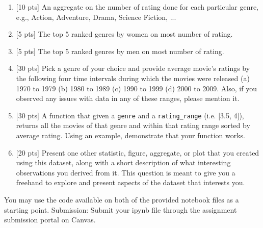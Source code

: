 \documentclass[letter-paper,12pt]{article} %
\begin{document}
\begin{enumerate}
    \item {[10 pts]} An aggregate on the number of rating done for each particular genre, e.g., Action, Adventure, Drama, Science Fiction, ...
    \item {[5 pts]} The top 5 ranked genres by women on most number of rating.
    \item {[5 pts]} The top 5 ranked genres by men on most number of rating.
    \item {[30 pts]} Pick a genre of your choice and provide average movie's ratings by the following four time intervals during which the movies were released (a) 1970 to 1979 (b) 1980 to 1989 (c) 1990 to 1999 (d) 2000 to 2009. Also, if you observed any issues with data in any of these ranges, please mention it.    
    \item {[30 pts]} A function that given a \verb|genre| and a \verb|rating_range| (i.e. [3.5, 4]), returns all the movies of that genre and within that rating range sorted by average rating. Using an example, demonstrate that your function works.  
    \item {[20 pts]} Present one other statistic, figure, aggregate, or plot that you created using this dataset, along with a short description of what interesting observations you derived from it. This question is meant to give you a freehand to explore and present aspects of the dataset that interests you. 
\end{enumerate}


You may use the code available on both of the provided notebook files as a starting point.
Submission:
Submit your ipynb file through the assignment submission portal on Canvas.
\end{document}
